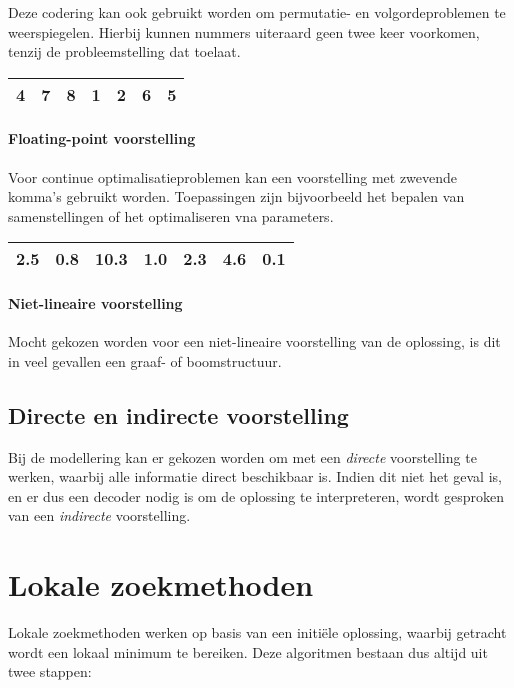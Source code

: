 Deze codering kan ook gebruikt worden om permutatie- en volgordeproblemen te weerspiegelen.
Hierbij kunnen nummers uiteraard geen twee keer voorkomen, tenzij de probleemstelling dat toelaat.
%
\begin{table}[!h]
    \centering
    \begin{tabular}{|l|l|l|l|l|l|l|}
    \hline
    4 & 7 & 8 & 1 & 2 & 6 & 5 \\ \hline
    \end{tabular}
\end{table}
%

\paragraph{Floating-point voorstelling}
Voor continue optimalisatieproblemen kan een voorstelling met zwevende komma's gebruikt worden.
Toepassingen zijn bijvoorbeeld het bepalen van samenstellingen of het optimaliseren vna parameters.

%
\begin{table}[!h]
    \centering
    \begin{tabular}{|l|l|l|l|l|l|l|}
    \hline
    2.5 & 0.8 & 10.3 & 1.0 & 2.3 & 4.6 & 0.1 \\ \hline
    \end{tabular}
\end{table}
%
\paragraph{Niet-lineaire voorstelling}
Mocht gekozen worden voor een niet-lineaire voorstelling van de oplossing, is dit in veel gevallen een graaf- of boomstructuur. 

\subsection{Directe en indirecte voorstelling}
Bij de modellering kan er gekozen worden om met een \emph{directe} voorstelling te werken, waarbij alle informatie direct beschikbaar is. Indien dit niet het geval is, en er dus een decoder nodig is om de oplossing te interpreteren, wordt gesproken van een \emph{indirecte} voorstelling.

\section{Lokale zoekmethoden}
Lokale zoekmethoden werken op basis van een initi\"ele oplossing, waarbij getracht wordt een lokaal minimum te bereiken. 
Deze algoritmen bestaan dus altijd uit twee stappen:

